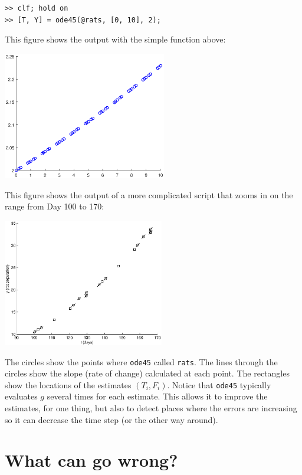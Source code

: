 \documentclass{book}
\begin{document}
\begin{verbatim}
>> clf; hold on
>> [T, Y] = ode45(@rats, [0, 10], 2);
\end{verbatim}
This figure shows the output with the simple function above:

\beforefig \centerline{\includegraphics[height=2.2in]{figs/ode45_simple.eps}}

This figure shows the output of a more complicated script that zooms
in on the range from Day 100 to 170:

\beforefig \centerline{\includegraphics[height=2.2in]{figs/ode45.eps}}

The circles show the points where {\tt ode45} called {\tt rats}.
The lines through the circles show the slope (rate of change) calculated
at each point.  The rectangles show the locations of the estimates
$(T_i, F_i)$.  Notice that {\tt ode45} typically evaluates
$g$ several times for each estimate.  This allows it to improve the
estimates, for one thing, but also to detect places where the errors
are increasing so it can decrease the time step (or the other
way around).


\section{What can go wrong?}
\end{document}
